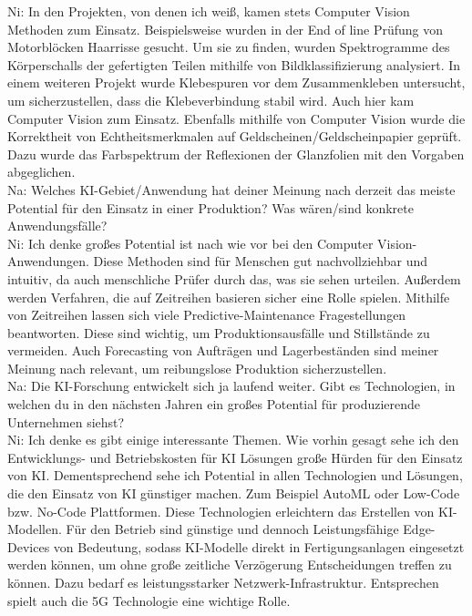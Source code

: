 \documentclass[a4paper,12pt, german]{report}
\begin{document}
Ni: In den Projekten, von denen ich weiß, kamen stets Computer Vision Methoden zum Einsatz. Beispielsweise wurden in der End of line Prüfung von Motorblöcken Haarrisse gesucht. Um sie zu finden, wurden Spektrogramme des Körperschalls der gefertigten Teilen mithilfe von Bildklassifizierung analysiert. \newline
In einem weiteren Projekt wurde Klebespuren vor dem Zusammenkleben untersucht, um sicherzustellen, dass die Klebeverbindung stabil wird. Auch hier kam Computer Vision zum Einsatz. \newline
Ebenfalls mithilfe von Computer Vision wurde die Korrektheit von Echtheitsmerkmalen auf Geldscheinen/Geldscheinpapier geprüft. Dazu wurde das Farbspektrum der Reflexionen der Glanzfolien mit den Vorgaben abgeglichen.
\\

Na:	Welches KI-Gebiet/Anwendung hat deiner Meinung nach derzeit das meiste Potential für den Einsatz in einer Produktion? Was wären/sind konkrete Anwendungsfälle?
\\

Ni: Ich denke großes Potential ist nach wie vor bei den Computer Vision-Anwendungen. Diese Methoden sind für Menschen gut nachvollziehbar und intuitiv, da auch menschliche Prüfer durch das, was sie sehen urteilen. Außerdem werden Verfahren, die auf Zeitreihen basieren sicher eine Rolle spielen. Mithilfe von Zeitreihen lassen sich viele Predictive-Maintenance Fragestellungen beantworten. Diese sind wichtig, um Produktionsausfälle und Stillstände zu vermeiden. Auch Forecasting von Aufträgen und Lagerbeständen sind meiner Meinung nach relevant, um reibungslose Produktion sicherzustellen.
\\

Na: Die KI-Forschung entwickelt sich ja laufend weiter. Gibt es Technologien, in welchen du in den nächsten Jahren ein großes Potential für produzierende Unternehmen siehst?
\\

Ni: Ich denke es gibt einige interessante Themen. Wie vorhin gesagt sehe ich den Entwicklungs- und Betriebskosten für KI Lösungen große Hürden für den Einsatz von KI. Dementsprechend sehe ich Potential in allen Technologien und Lösungen, die den Einsatz von KI günstiger machen. Zum Beispiel AutoML oder Low-Code bzw. No-Code Plattformen. Diese Technologien erleichtern das Erstellen von KI-Modellen. Für den Betrieb sind günstige und dennoch Leistungsfähige Edge-Devices von Bedeutung, sodass KI-Modelle direkt in Fertigungsanlagen eingesetzt werden können, um ohne große zeitliche Verzögerung Entscheidungen treffen zu können. Dazu bedarf es leistungsstarker Netzwerk-Infrastruktur. Entsprechen spielt auch die 5G Technologie eine wichtige Rolle.
\end{document}
